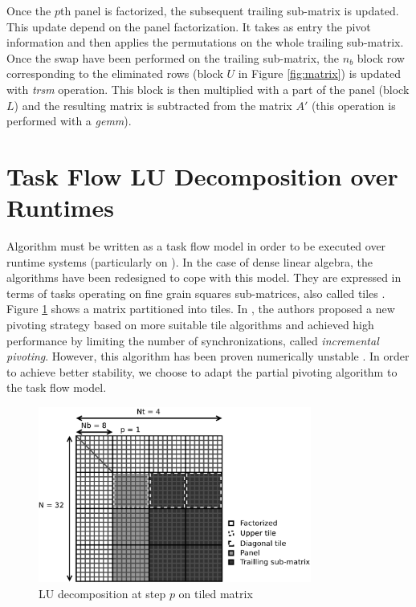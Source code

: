 Once the $p$th panel is factorized, the subsequent trailing sub-matrix is updated. This update depend on the panel factorization. It takes as entry the pivot information and then applies the permutations on the whole trailing sub-matrix. Once the swap have been performed on the trailing sub-matrix, the $n_b$ block row corresponding to the eliminated rows (block $U$ in Figure \ref{fig:matrix}) is updated with \textit{trsm} operation. This block is then multiplied with a part of the panel (block $L$) and the resulting matrix is subtracted from the matrix $A'$ (this operation is performed with a \textit{gemm}).

\section{Task Flow LU Decomposition over Runtimes \label{task_flow_lu}}
Algorithm must be written as a task flow model in order to be executed over runtime systems (particularly on \dague). In the case of dense linear algebra, the algorithms have been redesigned to cope with this model. They are expressed in terms of tasks operating on fine grain squares sub-matrices, also called tiles \cite{conf/para/ButtariDKLLT06,ChanEtAl07b}. Figure \ref{fig:tiled_matrix} shows a matrix partitioned into tiles. In \cite{Buttari09}, the authors proposed a new pivoting strategy based on \cite{Quintana-Orti:2009:ULF} more suitable tile algorithms and achieved high performance by limiting the number of synchronizations, called \emph{incremental pivoting}. However, this algorithm has been proven numerically unstable \cite{journals/siammax/GrigoriDX11}. In order to achieve better stability, we choose to adapt the partial pivoting algorithm to the task flow model.

\begin{figure}[!ht]
\centering
\includegraphics[width=0.8\textwidth]{figures/tiled_matrix.pdf}
\caption{LU decomposition at step $p$ on tiled matrix \label{fig:tiled_matrix}}
\end{figure}

